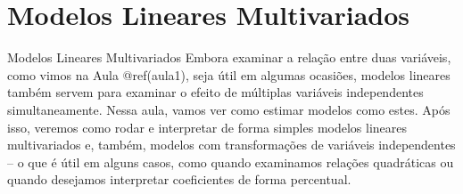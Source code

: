 \documentclass[
  9pt,
  ignorenonframetext,
  aspectratio=169]{beamer}
\begin{document}
\hypertarget{aula2}{%
\section{Modelos Lineares Multivariados}\label{aula2}}

\begin{frame}{Modelos Lineares Multivariados}
Embora examinar a relação entre duas variáveis, como vimos na Aula
@ref(aula1), seja útil em algumas ocasiões, modelos lineares também
servem para examinar o efeito de múltiplas variáveis independentes
simultaneamente. Nessa aula, vamos ver como estimar modelos como estes.
Após isso, veremos como rodar e interpretar de forma simples modelos
lineares multivariados e, também, modelos com transformações de
variáveis independentes -- o que é útil em alguns casos, como quando
examinamos relações quadráticas ou quando desejamos interpretar
coeficientes de forma percentual.
\end{frame}
\end{document}
